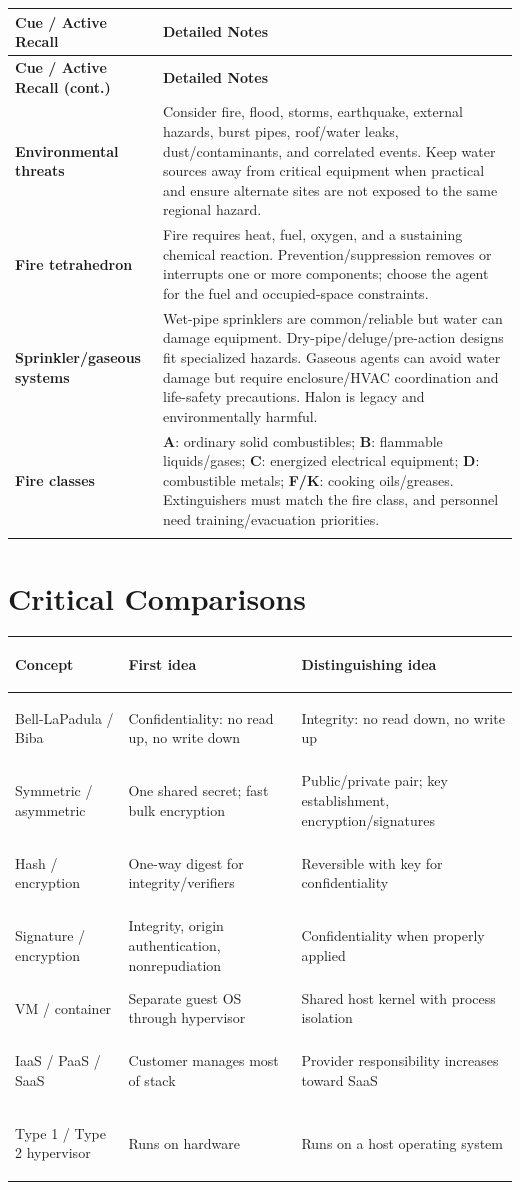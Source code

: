 \documentclass[10pt,letterpaper]{article}
\makeatletter
\newenvironment{cornell}{\rowcolors{2}{white}{notebg}\begin{longtable}{@{}>{\raggedright\arraybackslash\columncolor{cuebg}\color{navy}\bfseries}p{0.285\textwidth}>{\raggedright\arraybackslash}p{0.65\textwidth}@{}}
\rowcolor{navy}\color{white}\textbf{Cue / Active Recall} & \color{white}\textbf{Detailed Notes}\\ \hline\endfirsthead
\rowcolor{navy}\color{white}\textbf{Cue / Active Recall (cont.)} & \color{white}\textbf{Detailed Notes}\\ \hline\endhead}{\end{longtable}}
\newcommand{\noterow}[2]{#1 & #2\\\arrayrulecolor{line}\hline}
\makeatother
\begin{document}
\begin{cornell}
\noterow{Environmental threats}{Consider fire, flood, storms, earthquake, external hazards, burst pipes, roof/water leaks, dust/contaminants, and correlated events. Keep water sources away from critical equipment when practical and ensure alternate sites are not exposed to the same regional hazard.}
\noterow{Fire tetrahedron}{Fire requires heat, fuel, oxygen, and a sustaining chemical reaction. Prevention/suppression removes or interrupts one or more components; choose the agent for the fuel and occupied-space constraints.}
\noterow{Sprinkler/gaseous systems}{Wet-pipe sprinklers are common/reliable but water can damage equipment. Dry-pipe/deluge/pre-action designs fit specialized hazards. Gaseous agents can avoid water damage but require enclosure/HVAC coordination and life-safety precautions. Halon is legacy and environmentally harmful.}
\noterow{Fire classes}{\textbf{A}: ordinary solid combustibles; \textbf{B}: flammable liquids/gases; \textbf{C}: energized electrical equipment; \textbf{D}: combustible metals; \textbf{F/K}: cooking oils/greases. Extinguishers must match the fire class, and personnel need training/evacuation priorities.}
\end{cornell}

\section{\color{navy}Critical Comparisons}
\begin{center}\small
\begin{tabularx}{\textwidth}{>{\bfseries\color{navy}\raggedright\arraybackslash}p{}>{\raggedright\arraybackslash}X>{\raggedright\arraybackslash}X}
\toprule Concept & First idea & Distinguishing idea\\\midrule
Bell-LaPadula / Biba & Confidentiality: no read up, no write down & Integrity: no read down, no write up\\
Symmetric / asymmetric & One shared secret; fast bulk encryption & Public/private pair; key establishment, encryption/signatures\\
Hash / encryption & One-way digest for integrity/verifiers & Reversible with key for confidentiality\\
Signature / encryption & Integrity, origin authentication, nonrepudiation & Confidentiality when properly applied\\
VM / container & Separate guest OS through hypervisor & Shared host kernel with process isolation\\
IaaS / PaaS / SaaS & Customer manages most of stack & Provider responsibility increases toward SaaS\\
Type 1 / Type 2 hypervisor & Runs on hardware & Runs on a host operating system\\
\bottomrule
\end{tabularx}
\end{center}
\end{document}
